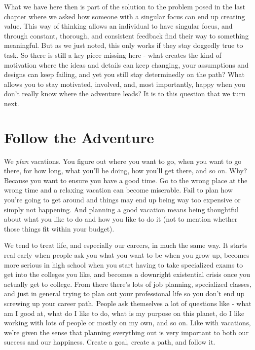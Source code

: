 \documentclass[11pt,a5paper]{book}
\begin{document}
What we have here then is part of the solution to the problem posed in the last chapter where we asked how someone with a singular focus can end up creating value. This way of thinking allows an individual to have singular focus, and through constant, thorough, and consistent feedback find their way to something meaningful. But as we just noted, this only works if they stay doggedly true to task. So there is still a key piece missing here - what creates the kind of motivation where the ideas and details can keep changing, your assumptions and designs can keep failing, and yet you still stay determinedly on the path? What allows you to stay motivated, involved, and, most importantly, happy when you don't really know where the adventure leads? It is to this question that we turn next.

\chapter{Follow the Adventure}
We \textit{plan} vacations. You figure out where you want to go, when you want to go there, for how long, what you'll be doing, how you'll get there, and so on. Why? Because you want to ensure you have a good time. Go to the wrong place at the wrong time and a relaxing vacation can become miserable. Fail to plan how you're going to get around and things may end up being way too expensive or simply not happening. And planning a good vacation means being thoughtful about what you like to do and how you like to do it (not to mention whether those things fit within your budget). 
\newline

We tend to treat life, and especially our careers, in much the same way. It starts real early when people ask you what you want to be when you grow up, becomes more serious in high school when you start having to take specialized exams to get into the colleges you like, and becomes a downright existential crisis once you actually get to college. From there there's lots of job planning, specialized classes, and just in general trying to plan out your professional life so you don't end up screwing up your career path. People ask themselves a lot of questions like - what am I good at, what do I like to do, what is my purpose on this planet, do I like working with lots of people or mostly on my own, and so on. Like with vacations, we're given the sense that planning everything out is very important to both our success and our happiness. Create a goal, create a path, and follow it.
\newline
\end{document}
